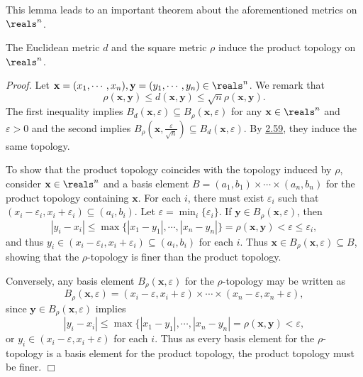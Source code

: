 This lemma leads to an important theorem about the aforementioned metrics on $\reals^n$.

\begin{theorem}\label{2.60}
    The Euclidean metric $d$ and the square metric $\rho$ induce the product topology on $\reals^n$.
\end{theorem}
{\it Proof.} Let $\mathbf{x} = (x_1, \cdots, x_n), \mathbf{y} = (y_1, \cdots, y_n) \in \reals^n$. We remark that
$$\rho(\mathbf{x}, \mathbf{y}) \leq d(\mathbf{x}, \mathbf{y}) \leq \sqrt{n} \rho(\mathbf{x}, \mathbf{y}).$$
The first inequality implies $B_d(\mathbf{x}, \varepsilon) \subseteq B_\rho(\mathbf{x}, \varepsilon)$ for any $\mathbf{x} \in \reals^n$ and $\varepsilon > 0$ and the second implies $B_\rho(\mathbf{x}, \frac{\varepsilon}{\sqrt{n}}) \subseteq B_d(\mathbf{x}, \varepsilon)$. By \hyperref[2.59]{2.59}, they induce the same topology.

To show that the product topology coincides with the topology induced by $\rho$, consider $\mathbf{x} \in \reals^n$ and a basis element $B= (a_1, b_1) \times \cdots \times (a_n, b_n)$ for the product topology containing $\mathbf{x}$. For each $i$, there must exist $\varepsilon_i$ such that $(x_i-\varepsilon_i, x_i+\varepsilon_i) \subseteq (a_i, b_i)$. Let $\varepsilon = \min_i\{\varepsilon_i\}$. If $\mathbf{y} \in B_\rho(\mathbf{x}, \varepsilon)$, then
$$|y_i - x_i| \leq \max \{|x_1-y_1|, \cdots, |x_n-y_n|\} = \rho(\mathbf{x}, \mathbf{y}) < \varepsilon \leq \varepsilon_i,$$
and thus $y_i \in (x_i- \varepsilon_i, x_i + \varepsilon_i) \subseteq (a_i, b_i)$ for each $i$. Thus $\mathbf{x} \in B_\rho(\mathbf{x}, \varepsilon) \subseteq B$, showing that the $\rho$-topology is finer than the product topology.

Conversely, any basis element $B_\rho(\mathbf{x}, \varepsilon)$ for the $\rho$-topology may be written as
$$B_\rho(\mathbf{x}, \varepsilon) = (x_i - \varepsilon, x_i+\varepsilon) \times \cdots \times (x_n - \varepsilon, x_n + \varepsilon),$$
since $\mathbf{y} \in B_\rho(\mathbf{x}, \varepsilon)$ implies
$$|y_i - x_i| \leq \max\{|x_1 - y_1|, \cdots, |x_n - y_n| = \rho(\mathbf{x}, \mathbf{y}) < \varepsilon,$$
or $y_i \in (x_i - \varepsilon, x_i + \varepsilon)$ for each $i$. Thus as every basis element for the $\rho$-topology is a basis element for the product topology, the product topology must be finer. $\Box$

